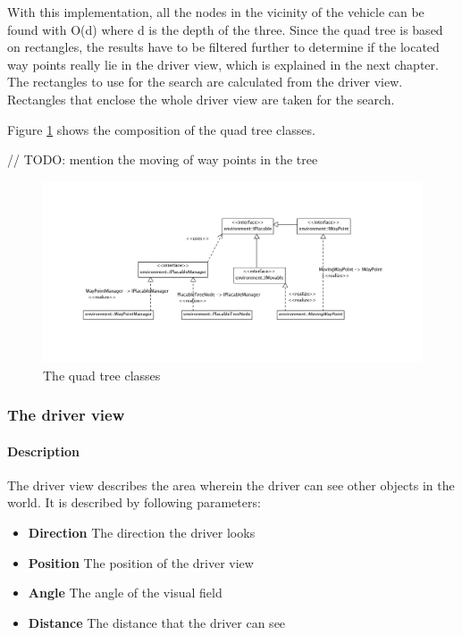 \noindent With this implementation, all the nodes in the vicinity of the
vehicle can be found with O(d) where d is the depth of the three. Since
the quad tree is based on rectangles, the results have to be filtered
further to determine if the located way points really lie in the driver
view, which is explained in the next chapter.\\

\noindent The rectangles to use for the search are calculated from the
driver view. Rectangles that enclose the whole driver view are taken
for the search.

\noindent Figure \ref{fig:quadTreeClasses} shows the composition of the
quad tree classes.

// TODO: mention the moving of way points in the tree

\begin{figure}[H]
\begin{center}
\includegraphics[width=\textwidth]{images/waypointsmanager.png}
\end{center}
\caption{The quad tree classes}
\label{fig:quadTreeClasses}
\end{figure}

\subsubsection{The driver view}
\label{sec:driverView}

\paragraph{Description}

The driver view describes the area wherein the driver can see other objects in
the world. It is described by following parameters:

\begin{itemize}
\item \textbf{Direction} The direction the driver looks
\item \textbf{Position} The position of the driver view 
\item \textbf{Angle} The angle of the visual field
\item \textbf{Distance} The distance that the driver can see
\end{itemize}

